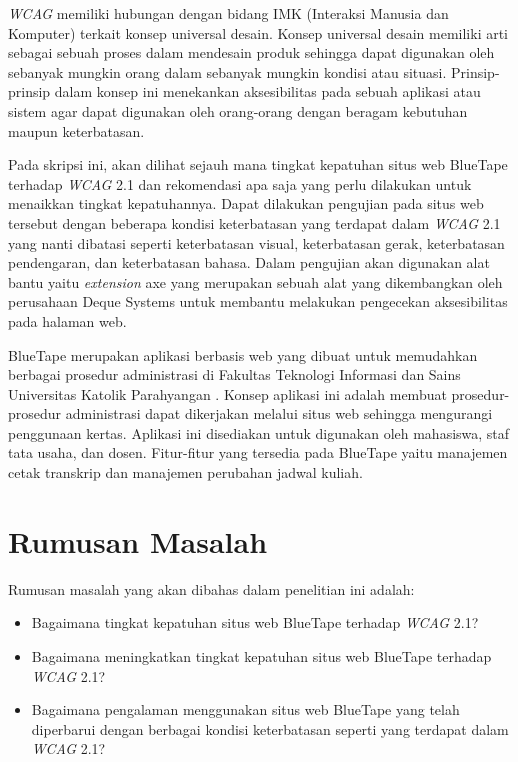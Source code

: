\textit{WCAG} memiliki hubungan dengan bidang IMK (Interaksi Manusia dan Komputer) terkait konsep universal desain. Konsep universal desain memiliki arti sebagai sebuah proses dalam mendesain produk sehingga dapat digunakan oleh sebanyak mungkin orang dalam sebanyak mungkin kondisi atau situasi. Prinsip-prinsip dalam konsep ini menekankan aksesibilitas pada sebuah aplikasi atau sistem agar dapat digunakan oleh orang-orang dengan beragam kebutuhan maupun keterbatasan.

Pada skripsi ini, akan dilihat sejauh mana tingkat kepatuhan situs web BlueTape terhadap \textit{WCAG} 2.1 dan rekomendasi apa saja yang perlu dilakukan untuk menaikkan tingkat kepatuhannya. Dapat dilakukan pengujian pada situs web tersebut dengan beberapa kondisi keterbatasan yang terdapat dalam \textit{WCAG} 2.1 yang nanti dibatasi seperti keterbatasan visual, keterbatasan gerak, keterbatasan pendengaran, dan keterbatasan bahasa. Dalam pengujian akan digunakan alat bantu yaitu \textit{extension} axe yang merupakan sebuah alat yang dikembangkan oleh perusahaan Deque Systems untuk membantu melakukan pengecekan aksesibilitas pada halaman web.

BlueTape merupakan aplikasi berbasis web yang dibuat untuk memudahkan berbagai prosedur administrasi di Fakultas Teknologi Informasi dan Sains Universitas Katolik Parahyangan \cite{BlueTape}. Konsep aplikasi ini adalah membuat prosedur-prosedur administrasi dapat dikerjakan melalui situs web sehingga mengurangi penggunaan kertas. Aplikasi ini disediakan untuk digunakan oleh mahasiswa, staf tata usaha, dan dosen. Fitur-fitur yang tersedia pada BlueTape yaitu manajemen cetak transkrip dan manajemen perubahan jadwal kuliah.

\section{Rumusan Masalah}
\label{sec:rumusan}
Rumusan masalah yang akan dibahas dalam penelitian ini adalah: 
\begin{itemize}
	\item Bagaimana tingkat kepatuhan situs web BlueTape terhadap \textit{WCAG} 2.1?
	\item Bagaimana meningkatkan tingkat kepatuhan situs web BlueTape terhadap \textit{WCAG} 2.1?  
	\item Bagaimana pengalaman menggunakan situs web BlueTape yang telah diperbarui dengan berbagai kondisi keterbatasan seperti yang terdapat dalam \textit{WCAG} 2.1?
\end{itemize}

